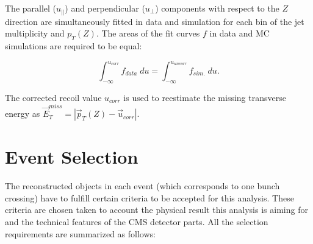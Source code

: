The parallel ($u_{||}$) and perpendicular ($u_{\perp}$) components with respect to the $Z$ direction are simultaneously fitted in data and simulation for each bin
of the jet multiplicity and $p_{T}(Z)$. The areas of the fit curves $f$ in data and MC simulations are required to be equal:

\begin{equation}
 \int_{-\infty}^{u_{corr}} f_{data}\; du = \int_{-\infty}^{u_{uncorr}} f_{sim.}\; du.
\end{equation}

The corrected recoil value $u_{corr}$ is used to reestimate the missing transverse energy as $\vec{E}_{T}^{miss} = | \vec{p}_{T}(Z) - \vec{u}_{corr} |$.

\section{Event Selection}

The reconstructed objects in each event (which corresponds to one bunch crossing) have to fulfill certain criteria to be accepted for this analysis. These 
criteria are chosen taken to account the physical result this analysis is aiming for and the technical features of the CMS detector parts.
All the selection requirements are summarized as follows:

